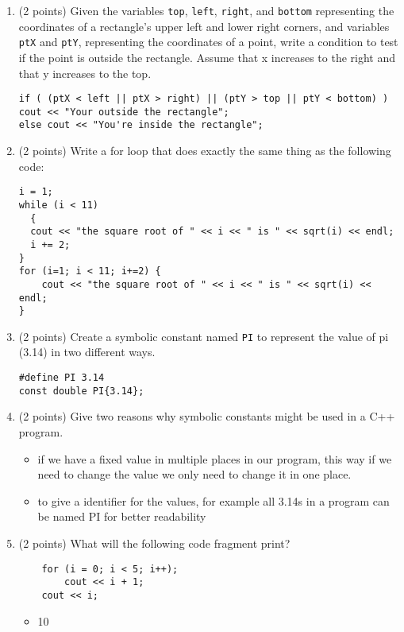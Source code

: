 \documentclass{report}
\begin{document}
\begin{enumerate}
    \item (2 points) Given the variables \texttt{top}, \texttt{left}, \texttt{right}, and \texttt{bottom} representing the coordinates of a rectangle's upper left and lower right corners, and variables \texttt{ptX} and \texttt{ptY}, representing the coordinates of a point, write a condition to test if the point is outside the rectangle. Assume that x increases to the right and that y increases to the top.
    \begin{verbatim}
if ( (ptX < left || ptX > right) || (ptY > top || ptY < bottom) ) cout << "Your outside the rectangle";
else cout << "You're inside the rectangle";
    \end{verbatim}
    
    
    \item (2 points) Write a for loop that does exactly the same thing as the following code:
    \begin{verbatim}
i = 1;
while (i < 11)
  {
  cout << "the square root of " << i << " is " << sqrt(i) << endl;
  i += 2;
}
for (i=1; i < 11; i+=2) {
    cout << "the square root of " << i << " is " << sqrt(i) << endl;
}

    \end{verbatim}
    
    \item (2 points) Create a symbolic constant named \texttt{PI} to represent the value of pi (3.14) in two different ways.
\begin{verbatim}
#define PI 3.14 
const double PI{3.14};
\end{verbatim}

    
    \item (2 points) Give two reasons why symbolic constants might be used in a C++ program.
    \begin{itemize}
        \item if we have a fixed value in multiple places in our program, this way if we need to change the value we only need to change it in one place.
        \item to give a identifier for the values, for example all 3.14s in a program can be named PI for better readability
    \end{itemize}
    
    \item (2 points) What will the following code fragment print?
    \begin{verbatim}
    for (i = 0; i < 5; i++);
        cout << i + 1;
    cout << i;
    \end{verbatim}
    \begin{itemize}
        \item 10
    \end{itemize}
    

\end{enumerate}
\end{document}

